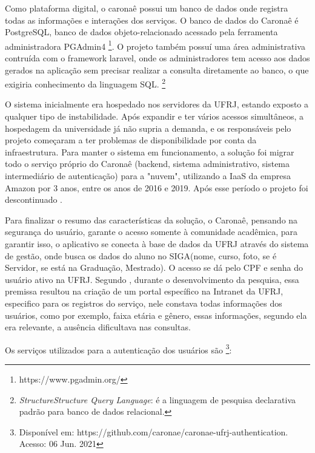 Como plataforma digital, o caronaê possui um banco de dados onde registra todas as informações e interações dos serviços. O banco de dados do Caronaê é PostgreSQL, banco de dados objeto-relacionado acessado pela ferramenta administradora PGAdmin4 \footnote{https://www.pgadmin.org/}. O projeto também possuí uma área administrativa contruída com o framework laravel, onde os administradores tem acesso aos dados gerados na aplicação sem precisar realizar a consulta diretamente ao banco, o que exigiria conhecimento da linguagem SQL. \footnote{\textit{StructureStructure Query Language}: é a linguagem de pesquisa declarativa padrão para banco de dados relacional.} 

O sistema inicialmente era hospedado nos servidores da UFRJ, estando exposto a qualquer tipo de instabilidade. Após expandir e ter vários acessos simultâneos, a hospedagem da universidade já não supria a demanda, e os responsáveis pelo projeto começaram a ter problemas de disponibilidade por conta da infraestrutura. Para manter o sistema em funcionamento, a solução foi migrar todo o serviço próprio do Caronaê (backend, sistema administrativo, sistema intermediário de autenticação) para a "nuvem", utilizando a IaaS da empresa Amazon por 3 anos, entre os anos de 2016 e 2019. Após esse período o projeto foi descontinuado \cite{caronae}. 

Para finalizar o resumo das características da solução, o Caronaê, pensando na segurança do usuário, garante o acesso somente à comunidade acadêmica, para garantir isso, o aplicativo se conecta à base de dados da UFRJ através do sistema de gestão, onde busca os dados do aluno no SIGA(nome, curso, foto, se é Servidor, se está na Graduação, Mestrado). O acesso se dá pelo CPF e senha do usuário ativo na UFRJ. Segundo \cite{caronae}, durante o desenvolvimento da pesquisa, essa premissa resultou na criação de um portal específico na Intranet da UFRJ, especifico para os registros do serviço, nele constava todas informações dos usuários, como por exemplo, faixa etária e gênero, essas informações, segundo ela era relevante, a ausência dificultava nas consultas.

Os serviços utilizados para a autenticação dos usuários são \footnote{Disponível em: https://github.com/caronae/caronae-ufrj-authentication. Acesso: 06 Jun. 2021}:

